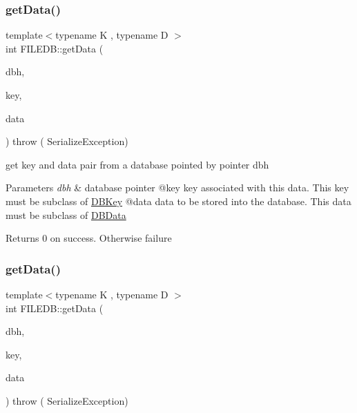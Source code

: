 \subsubsection{\texorpdfstring{getData()}{getData()}\hspace{0.1cm}{\footnotesize\ttfamily [1/2]}}
{\footnotesize\ttfamily template$<$typename K , typename D $>$ \\
int F\+I\+L\+E\+D\+B\+::get\+Data (\begin{DoxyParamCaption}\item[{\mbox{\hyperlink{adat-devel_2other__libs_2filedb_2filehash_2ffdb__db_8h_a0b27b956926453a7a8141ea8e10f0df8}{F\+F\+D\+B\+\_\+\+DB}} $\ast$}]{dbh,  }\item[{const K \&}]{key,  }\item[{D \&}]{data }\end{DoxyParamCaption}) throw ( Serialize\+Exception) }

get key and data pair from a database pointed by pointer dbh


\begin{DoxyParams}{Parameters}
{\em dbh} & database pointer @key key associated with this data. This key must be subclass of \mbox{\hyperlink{classFILEDB_1_1DBKey}{D\+B\+Key}} @data data to be stored into the database. This data must be subclass of \mbox{\hyperlink{classFILEDB_1_1DBData}{D\+B\+Data}}\\
\hline
\end{DoxyParams}
\begin{DoxyReturn}{Returns}
0 on success. Otherwise failure 
\end{DoxyReturn}
\mbox{\label{namespaceFILEDB_a7381d9e3dd76dc6eb741797e16c3052c}} 
\subsubsection{\texorpdfstring{getData()}{getData()}\hspace{0.1cm}{\footnotesize\ttfamily [2/2]}}
{\footnotesize\ttfamily template$<$typename K , typename D $>$ \\
int F\+I\+L\+E\+D\+B\+::get\+Data (\begin{DoxyParamCaption}\item[{\mbox{\hyperlink{adat-devel_2other__libs_2filedb_2filehash_2ffdb__db_8h_a0b27b956926453a7a8141ea8e10f0df8}{F\+F\+D\+B\+\_\+\+DB}} $\ast$}]{dbh,  }\item[{const K \&}]{key,  }\item[{std\+::string \&}]{data }\end{DoxyParamCaption}) throw ( Serialize\+Exception) }

